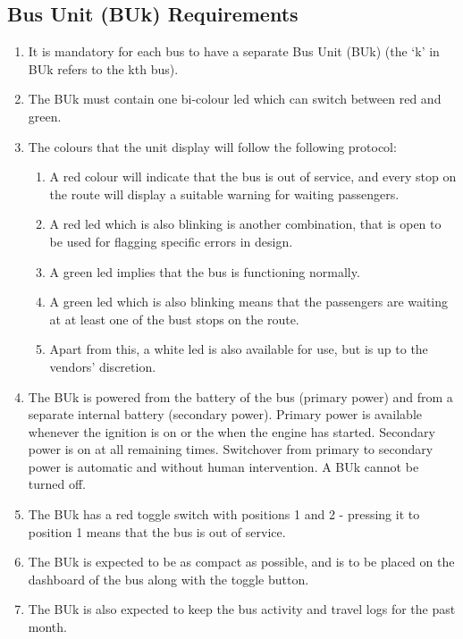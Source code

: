 \documentclass[12pt]{article} %
\begin{document}
\subsection{Bus Unit (BUk) Requirements}
\begin{enumerate}
    \item It is mandatory for each bus to have a separate Bus Unit (BUk) (the ‘k’ in BUk refers to the kth bus).
    \item The BUk must contain one bi-colour \acrshort{led} which can switch between red and green.
    \item The colours that the unit display will follow the following protocol:
    \begin{enumerate}
        \item A red colour will indicate that the bus is out of service, and every stop on the route will display a suitable warning for waiting passengers. 
        \item A red \acrshort{led} which is also blinking is another combination, that is open to be used for flagging specific errors in design.
        \item A green \acrshort{led} implies that the bus is functioning normally.
        \item A green \acrshort{led} which is also blinking means that the passengers are waiting at at least one of the bust stops on the route.
        \item Apart from this, a white \acrshort{led} is also available for use, but is up to the vendors’ discretion. 
    \end{enumerate}
    \item The BUk is powered from the battery of the bus (primary power) and from a separate internal battery (secondary power). Primary power is available whenever the ignition is on or the when the engine has started. Secondary power is on at all remaining times. Switchover from primary to secondary power is automatic and without human intervention. A BUk cannot be turned off. 
    \item The BUk has a red toggle switch with positions 1 and 2 - pressing it to position 1 means that the bus is out of service.
    \item The BUk is expected to be as compact as possible, and is to be placed on the dashboard of the bus along with the toggle button.
    \item The BUk is also expected to keep the bus activity and travel logs for the past month.
\end{enumerate}
\end{document}
